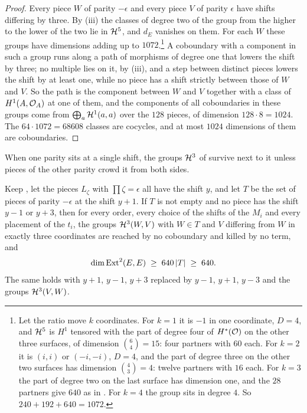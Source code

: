 \begin{proof}
Every piece $W$ of parity $-\epsilon$ and every piece $V$ of parity $\epsilon$
have shifts differing by three. By (iii) the classes
of degree two of the group from the higher to the lower of the two lie in
$\mathcal{H}^{5}$, and $d_{E}$ vanishes on them. For each $W$ these groups have
dimensions adding up to $1072$.\footnote{Let the ratio move $k$
coordinates. For $k=1$ it is $-1$ in one coordinate, $D=4$, and $\mathcal{H}^{5}$
is $H^{1}$ tensored with the part of degree four of $H^{*}(\mathcal{O})$ on the
other three surfaces, of dimension $\binom{6}{4}=15$: four partners with
$60$ each. For $k=2$ it is $(i,i)$ or $(-i,-i)$, $D=4$, and the part of
degree three on the other two surfaces has dimension $\binom43=4$: twelve
partners with $16$ each. For $k=3$ the part of degree two on the last surface
has dimension one, and the $28$ partners give $640$ as in
. For $k=4$ the group sits in degree $4$. So
$240+192+640=1072$.} A coboundary with a component in such a group runs
along a path of morphisms of degree one that lowers the shift by three;
no multiple lies on it, by (iii), and a step between
distinct pieces lowers the shift by at least one, while no piece has a shift
strictly between those of $W$ and $V$. So the path is the component between
$W$ and $V$ together with a class of $H^{1}(A,\mathcal{O}_{A})$ at one of them, and
the components of all coboundaries in these groups come from
$\bigoplus_{a}\mathcal{H}^{1}(a,a)$ over the $128$ pieces, of dimension
$128\cdot8=1024$. The $64\cdot1072=68608$ classes are cocycles, and at most
$1024$ dimensions of them are coboundaries.
\end{proof}

When one parity sits at a single shift, the groups $\mathcal{H}^{3}$ of
 survive next to it unless pieces of the other
parity crowd it from both sides.

\begin{proposition}\label{prop:efourgap}
Keep , let the pieces $L_{\zeta}$ with
$\prod\zeta=\epsilon$ all have the shift $y$, and let $T$ be the set of
pieces of parity $-\epsilon$ at the shift $y+1$. If $T$ is not empty and no
piece has the shift $y-1$ or $y+3$, then for every order, every choice of
the shifts of the $M_{i}$ and every placement of the $t_{i}$, the groups
$\mathcal{H}^{3}(W,V)$ with $W\in T$ and $V$ differing from $W$ in exactly three
coordinates are reached by no coboundary and killed by no term, and
\[
  \dim\operatorname{Ext}^{2}(E,E)\;\ge\;640\,|T|\;\ge\;640 .
\]
The same holds with $y+1$, $y-1$, $y+3$ replaced by $y-1$, $y+1$, $y-3$ and
the groups $\mathcal{H}^{3}(V,W)$.
\end{proposition}

